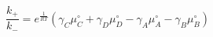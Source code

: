 \begin{equation}
\frac{k_+}{k_-}  = e^\frac{1}{RT}\left(\gamma_C\mu_C^\circ+ \gamma_D\mu_D^\circ -\gamma_A\mu_A^\circ-\gamma_B\mu_B^\circ\right)
\end{equation}